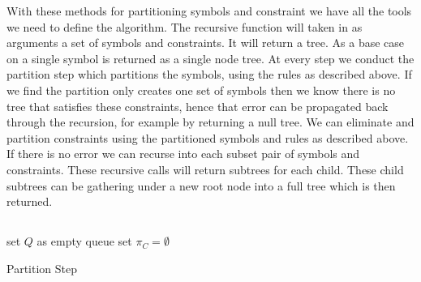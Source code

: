 With these methods for partitioning symbols and constraint we have all the tools we need to define the  algorithm.
The recursive  function will taken in as arguments a set of symbols and constraints.
It will return a tree. As a base case  on a single symbol is returned as a single node tree.
At every step we conduct the partition step which partitions the symbols, using the rules as described above.
If we find the partition only creates one set of symbols then we know there is no tree that satisfies these constraints, hence that error can be propagated back through the recursion, for example by returning a null tree.
We can eliminate and partition constraints using the partitioned symbols and rules as described above.
If there is no error we can recurse into each subset pair of symbols and constraints.
These recursive calls will return subtrees for each child. These child subtrees can be gathering under a new root node into a full tree which is then returned.    

\subsection{}
\begin{algorithm}[H]
    \SetAlgoLined
     set $Q$ as empty queue\;
     set $\pi_C = \emptyset$\;
     
    
     \caption{Partition Step}
    \end{algorithm}

